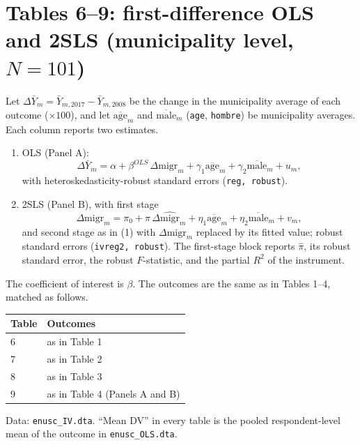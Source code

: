 \documentclass{article}
\begin{document}
\section*{Tables 6--9: first-difference OLS and 2SLS (municipality level, \(N = 101\))}
Let \(\Delta \bar Y_m = \bar Y_{m,2017} - \bar Y_{m,2008}\) be the change in the municipality average of each outcome (\(\times 100\)), and let \(\overline{\mathrm{age}}_m\) and \(\overline{\mathrm{male}}_m\) (\texttt{age}, \texttt{hombre}) be municipality averages. Each column reports two estimates.
\begin{enumerate}
    \item OLS (Panel A):
    \begin{equation*}
        \Delta \bar Y_m = \alpha + \beta^{OLS}\,\Delta\mathrm{migr}_m + \gamma_1 \overline{\mathrm{age}}_m + \gamma_2 \overline{\mathrm{male}}_m + u_m,
    \end{equation*}
    with heteroskedasticity-robust standard errors (\texttt{reg, robust}).
    \item 2SLS (Panel B), with first stage
    \begin{equation*}
        \Delta\mathrm{migr}_m = \pi_0 + \pi\,\Delta\widehat{\mathrm{migr}}_m + \eta_1 \overline{\mathrm{age}}_m + \eta_2 \overline{\mathrm{male}}_m + v_m,
    \end{equation*}
    and second stage as in (1) with \(\Delta\mathrm{migr}_m\) replaced by its fitted value; robust standard errors (\texttt{ivreg2, robust}). The first-stage block reports \(\hat\pi\), its robust standard error, the robust \(F\)-statistic, and the partial \(R^2\) of the instrument.
\end{enumerate}
The coefficient of interest is \(\beta\). The outcomes are the same as in Tables 1--4, matched as follows.
\begin{center}
\begin{tabular}{@{}ll@{}}
    Table & Outcomes\\
    \hline
    6 & as in Table 1\\
    7 & as in Table 2\\
    8 & as in Table 3\\
    9 & as in Table 4 (Panels A and B)\\
\end{tabular}
\end{center}
Data: \texttt{enusc\_IV.dta}. ``Mean DV'' in every table is the pooled respondent-level mean of the outcome in \texttt{enusc\_OLS.dta}.
\end{document}
